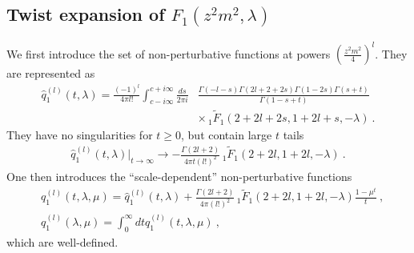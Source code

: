 \documentclass[a4paper,11pt]{article}
\begin{document}
\subsection{Twist expansion of $F_1(z^2m^2,\lambda)$}
We first introduce the set of non-perturbative functions at powers $\left(\frac{z^2m^2}{4}\right)^l$. They are represented as
\begin{align}\label{eq:q1l}
\hat q_1^{(l)}(t,\lambda)=\frac{(-1)^l}{4\pi l!}\int_{c-i\infty}^{c+i\infty}\frac{ds}{2\pi i}&\frac{\Gamma(-l-s)\Gamma(2l+2+2s)\Gamma(1-2s)\Gamma(s+t)}{\Gamma(1-s+t)}\nonumber \\ & \times\,_1\tilde F_1(2+2l+2s,1+2l+s,-\lambda) \ .
\end{align}
They have no singularities for $t\ge 0$, but contain large $t$ tails
\begin{align}
\hat q^{(l)}_1(t,\lambda)|_{t\rightarrow \infty} \rightarrow -\frac{\Gamma(2l+2)}{4\pi t (l!)^2}\,_1\tilde F_1(2+2l,1+2l,-\lambda) \ .
\end{align}
One then introduces the ``scale-dependent'' non-perturbative functions
\begin{align}
&q_1^{(l)}(t,\lambda,\mu)=\hat q_1^{(l)}(t,\lambda)+\frac{\Gamma(2l+2)}{4\pi (l!)^2}\,_1\tilde F_1(2+2l,1+2l,-\lambda)\frac{1-\mu^t}{t} \ , \\
&q_1^{(l)}(\lambda,\mu)=\int_{0}^{\infty} dt q_1^{(l)}(t,\lambda,\mu) \ , \label{eq:q1lmu}
\end{align}
which are well-defined. 
\end{document}
